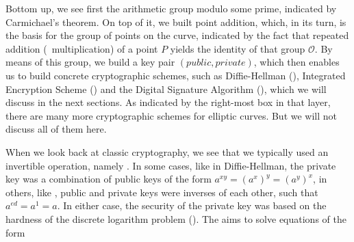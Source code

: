 \documentclass[tikz]{scrreprt}
\begin{document}
\begin{center}
\end{center}
\ignore{$}

Bottom up, we see first the arithmetic group
modulo some prime, indicated by Car\-michael's
theorem. On top of it, we built point addition,
which, in its turn, is the basis for the group
of points on the curve, indicated by the fact
that repeated addition (\ie\ multiplication)
of a point $P$ yields the identity of that group
$\mathcal{O}$. By means of this group,
we build a key pair $(public,private)$,
which then enables us to build concrete
cryptographic schemes, such as 
 Diffie-Hellman (),
 Integrated Encryption Scheme () and the
 Digital Signature Algorithm (),
which we will discuss in the next sections.
As indicated by the right-most box in that layer,
there are many more cryptographic schemes
for elliptic curves.
But we will not discuss all of them here. 

When we look back at classic cryptography, we see
that we typically used an invertible operation,
namely . In some cases,
like in Diffie-Hellman, the private key was a
combination of public keys of the form
$a^{xy} = (a^x)^y = (a^y)^x$,
in others,
like , public and private keys
were inverses of each other, such that 
$a^{ed} = a^1 = a$.
In either case, the security of the private key
was based on the hardness of the 
discrete logarithm problem ().
The  aims to solve equations
of the form 
\end{document}
